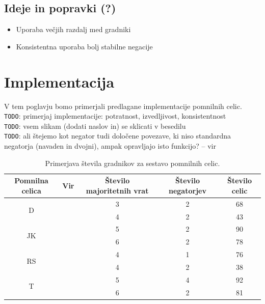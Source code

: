\documentclass[a4paper, 11pt]{article}
\newcommand{\todo}{\textcolor{BrickRed}{\texttt{TODO}}} %
\begin{document}

\subsection{Ideje in popravki (?)}
\begin{itemize}
\item Uporaba večjih razdalj med gradniki
\item Konsistentna uporaba bolj stabilne negacije
\end{itemize}

\section{Implementacija}
V tem poglavju bomo primerjali predlagane implementacije pomnilnih celic.\\
\todo: primerjaj implementacije: potratnost, izvedljivost, konsistentnost\\



\todo: vsem slikam (dodati naslov in) se sklicati v besedilu\\
\todo: ali štejemo kot negator tudi določene povezave, ki niso standardna negatorja (navaden in dvojni), ampak opravljajo isto funkcijo? -- vir \cite{quantum_dot}

\begin{table}
\begin{tabular}{|c|c|c|c|c|}
\hline 
Pomnilna celica & Vir & Število majoritetnih vrat & Število negatorjev & Število celic \\ 
\hline 
\multirow{2}{*}{D} & \cite{quantum_dot} & 3 & 2 & 68 \\ 
& \cite{a_novel_approach} & 4 & 2 & 43 \\ 
\hline 
\multirow{2}{*}{JK} & \cite{quantum_dot} & 5 & 2 & 90 \\ 
& \cite{a_novel_approach} & 6 & 2 & 78 \\ 
\hline 
\multirow{2}{*}{RS} & \cite{quantum_dot} & 4 & 1 & 76 \\ 
& \cite{a_novel_approach} & 4 & 2 & 38 \\ 
\hline 
\multirow{2}{*}{T} & \cite{quantum_dot} & 5 & 4 & 92 \\  
& \cite{a_novel_approach} & 6 & 2 & 81 \\ 
\hline 
\end{tabular}
\caption{Primerjava števila gradnikov za sestavo pomnilnih celic.} 
\label{st-gradnikov}
\end{table}
\end{document}
